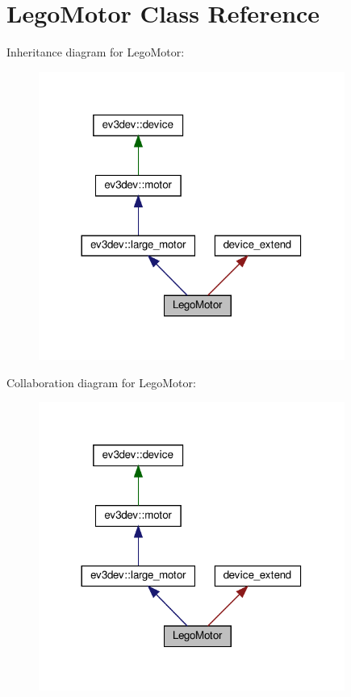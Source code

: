 \hypertarget{classLegoMotor}{}\section{Lego\+Motor Class Reference}
\label{classLegoMotor}


Inheritance diagram for Lego\+Motor\+:
\nopagebreak
\begin{figure}[H]
\begin{center}
\leavevmode
\includegraphics[width=284pt]{classLegoMotor__inherit__graph}
\end{center}
\end{figure}


Collaboration diagram for Lego\+Motor\+:
\nopagebreak
\begin{figure}[H]
\begin{center}
\leavevmode
\includegraphics[width=284pt]{classLegoMotor__coll__graph}
\end{center}
\end{figure}
